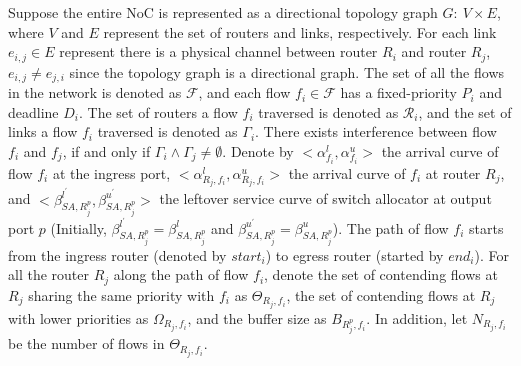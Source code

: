 \documentclass[10pt,journal]{IEEEtran}
\begin{document}
Suppose the entire NoC is represented as a directional topology graph $G:\ V\times E$, where $V$ and $E$ represent the set of routers and links, respectively. For each link $e_{i,j}\in E$ represent there is a physical channel between router $R_i$ and router $R_j$, $e_{i,j}\neq e_{j,i}$ since the topology graph is a directional graph. The set of all the flows in the network is denoted as $\mathcal{F}$, and each flow $f_i\in\mathcal{F}$ has a fixed-priority $P_i$ and deadline $D_i$. The set of routers a flow $f_i$ traversed is denoted as $\mathcal{R}_i$, and the set of links a flow $f_i$ traversed is denoted as $\Gamma_i$. There exists interference between flow $f_i$ and $f_j$, if and only if $\Gamma_i\wedge\Gamma_j\neq\emptyset$. Denote by $<\alpha_{f_i}^l,\alpha_{f_i}^u>$ the arrival curve of flow $f_i$ at the ingress port, $<\alpha_{R_j,f_i}^l,\alpha_{R_j,f_i}^u>$ the arrival curve of $f_i$ at router $R_j$, and $<\beta_{SA,R_j^{p}}^{l^\prime},\beta_{SA,R_j^{p}}^{u^\prime}>$ the leftover service curve of switch allocator at output port $p$ (Initially, $\beta_{SA,R_j^{p}}^{l^\prime}=\beta_{SA,R_j^{p}}^{l}$ and $\beta_{SA,R_j^{p}}^{u^\prime}=\beta_{SA,R_j^{p}}^{u}$). The path of flow $f_i$ starts from the ingress router (denoted by $start_i$) to egress router (started by $end_i$). For all the router $R_j$ along the path of flow $f_i$, denote the set of contending flows at $R_j$ sharing the same priority with $f_i$ as $\Theta_{R_j,f_i}$, the set of contending flows at $R_j$ with lower priorities as $\Omega_{R_j,f_i}$, and the buffer size as $B_{R_j^{p},f_i}$. In addition, let $N_{R_j,f_i}$ be the number of flows in $\Theta_{R_j,f_i}$.
\end{document}

